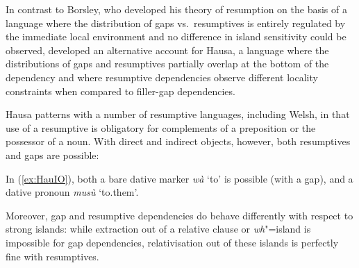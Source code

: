 \documentclass[output=paper
                ,modfonts
                ,nonflat
	        ,collection
	        ,collectionchapter
	        ,collectiontoclongg
 	        ,biblatex
                ,babelshorthands
                ,newtxmath
                ,draftmode
                ,colorlinks, citecolor=brown
]{./langsci/langscibook}
\begin{document}
{In contrast to Borsley, who developed his theory of resumption on the
basis of a language where the distribution of gaps vs.\ resumptives is
entirely regulated by the immediate local environment and no
difference in island sensitivity could be observed,
\citet{Crysmann:12} developed an alternative account for Hausa, a
language where the distributions of gaps and resumptives partially
overlap at the bottom of the dependency and where resumptive
dependencies observe different locality constraints when compared to
filler-gap dependencies.

Hausa patterns with a number of resumptive languages, including Welsh, in that use of a resumptive is obligatory for complements of a preposition or the possessor of a noun. With direct and indirect objects, however, both resumptives and gaps are possible: 

\begin{exe}
  \ex \label{ex:HauIO}
  \begin{xlist}
     
  \end{xlist}
\end{exe}


\noindent
In (\ref{ex:HauIO}), both a bare dative marker \textit{wà} `to' is
possible (with a gap), and a dative pronoun \textit{musù} `to.them'.

Moreover, gap and resumptive dependencies do behave differently with
respect to strong islands: while extraction out of a relative clause
or \emph{wh}"=island is impossible for gap dependencies,
relativisation out of these islands is perfectly fine with
resumptives.

\begin{exe}
   \label{ex:HauResLongIO}
\end{exe}

}
\end{document}
